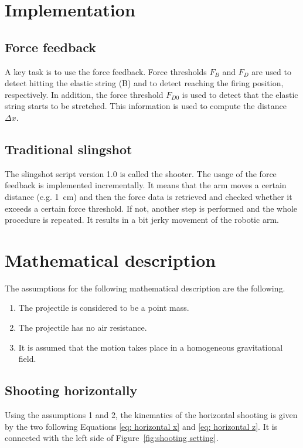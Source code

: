 	\section{Implementation}

		\subsection{Force feedback}	

			A key task is to use the force feedback. Force thresholds $F_B$ and $F_D$ are used to detect hitting the elastic string (B) and to detect reaching the firing position, respectively. In addition, the force threshold $F_{D0}$ is used to detect that the elastic string starts to be stretched. This information is used to compute the distance $\Delta x$.

		\subsection{Traditional slingshot} \label{sec: implementation of slingshot 1.0}
		The slingshot script version 1.0 is called the shooter. The usage of the force feedback is implemented incrementally. It means that the arm moves a certain distance (e.g. \SI{1}{cm}) and then the force data is retrieved and checked whether it exceeds a certain force threshold. If not, another step is performed and the whole procedure is repeated. It results in a bit jerky movement of the robotic arm.
	
	\section{Mathematical description}
	
		The assumptions for the following mathematical description are the following.
%		
\begin{enumerate}\itemsep0pt
			\item The projectile is considered to be a point mass.
			\item The projectile has no air resistance.
			\item It is assumed that the motion takes place in a homogeneous gravitational field.			
\end{enumerate}	
		
		\subsection{Shooting horizontally}			
			
			Using the assumptions 1 and 2, the kinematics of the horizontal shooting is given by the two following Equations \eqref{eq: horizontal x} and \eqref{eq: horizontal z}. It is connected with the left side of Figure~\ref{fig:shooting setting}.
		

